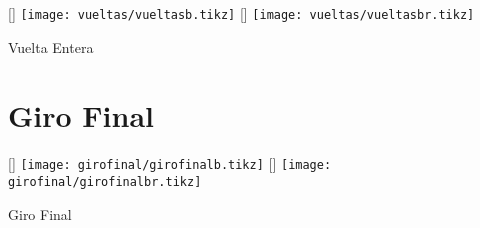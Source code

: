 \begin{minipage}{\linewidth}
	\captionsetup{type=figure}
	[\ahalf\linewidth]
	{\texttt{[image: vueltas/vueltasb.tikz]}}
	\hspace*{\fill}
	[\ahalf\linewidth]
	{\texttt{[image: vueltas/vueltasbr.tikz]}}
	\caption{Vuelta Entera}
	\label{fig:vuelta}
\end{minipage}

\FloatBarrier
\section{Giro Final}
\label{sec:girofinal}

\begin{minipage}{\linewidth}
	\captionsetup{type=figure}
	[\ahalf\linewidth]
	{\texttt{[image: girofinal/girofinalb.tikz]}}
	\hspace*{\fill}
	[\ahalf\linewidth]
	{\texttt{[image: girofinal/girofinalbr.tikz]}}
	\caption{Giro Final}
	\label{fig:girofinal}
\end{minipage}
\fi
